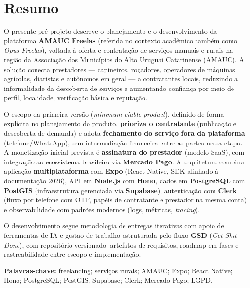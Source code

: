 \documentclass[12pt, a4paper]{article}
\begin{document}
\section*{Resumo}

\noindent O presente pré-projeto descreve o planejamento e o desenvolvimento
da plataforma \textbf{AMAUC Freelas} (referida no contexto acadêmico também
como \textit{Opus Freelas}), voltada à oferta e contratação de serviços
manuais e rurais na região da Associação dos Municípios do Alto Uruguai
Catarinense (AMAUC). A solução conecta prestadores --- capineiros,
roçadores, operadores de máquinas agrícolas, diaristas e autônomos em
geral --- a contratantes locais, reduzindo a informalidade da descoberta
de serviços e aumentando confiança por meio de perfil, localidade,
verificação básica e reputação.

O escopo da primeira versão (\textit{minimum viable product}), definido de
forma explícita no planejamento do produto, \textbf{prioriza o contratante}
(publicação e descoberta de demanda) e adota \textbf{fechamento do serviço
fora da plataforma} (telefone/WhatsApp), sem intermediação financeira entre
as partes nessa etapa. A monetização inicial prevista é \textbf{assinatura
do prestador} (modelo SaaS), com integração ao ecossistema brasileiro via
\textbf{Mercado Pago}. A arquitetura combina aplicação \textbf{multiplataforma}
com \textbf{Expo} (React Native, SDK alinhado à documentação 2026), API em
\textbf{Node.js} com \textbf{Hono}, dados em \textbf{PostgreSQL} com
\textbf{PostGIS} (infraestrutura gerenciada via \textbf{Supabase}),
autenticação com \textbf{Clerk} (fluxo por telefone com OTP, papéis de
contratante e prestador na mesma conta) e observabilidade com padrões
modernos (logs, métricas, \textit{tracing}).

O desenvolvimento segue metodologia de entregas iterativas com apoio de
ferramentas de IA e gestão de trabalho estruturada pelo fluxo
\textbf{GSD} (\textit{Get Shit Done}), com repositório versionado,
artefatos de requisitos, roadmap em fases e rastreabilidade entre escopo
e implementação.

\medskip
\noindent\textbf{Palavras-chave:} freelancing; serviços rurais; AMAUC;
Expo; React Native; Hono; PostgreSQL; PostGIS; Supabase; Clerk;
Mercado Pago; LGPD.

\newpage

\end{document}
